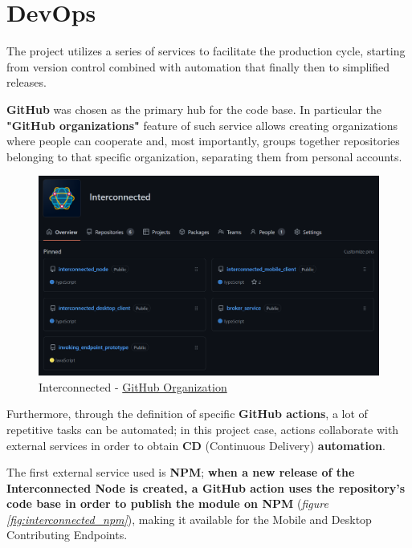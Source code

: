 \section{DevOps}\label{devops}
The project utilizes a series of services to facilitate the production cycle, starting from version control combined with automation that finally then to simplified releases.

\textbf{GitHub} was chosen as the primary hub for the code base. In particular the \textbf{"GitHub organizations"} feature of such service allows creating organizations where people can cooperate and, most importantly, groups together repositories belonging to that specific organization, separating them from personal accounts.

\begin{figure}[!ht]
    \centering
    \includegraphics[width=\linewidth]{document/chapters/chapter_7/images/interconnected_organization.png}
    \caption{Interconnected - \href{https://github.com/Interconnected-project}{GitHub Organization}}
    \label{fig:interconnected_organization}
\end{figure}

Furthermore, through the definition of specific \textbf{GitHub actions}, a lot of repetitive tasks can be automated; in this project case, actions collaborate with external services in order to obtain \textbf{CD} (Continuous Delivery) \textbf{automation}.

The first external service used is \textbf{NPM}; \textbf{when a new release of the Interconnected Node is created, a GitHub action uses the repository's code base in order to publish the module on NPM} (\textit{figure \ref{fig:interconnected_npm}}), making it available for the Mobile and Desktop Contributing Endpoints.

